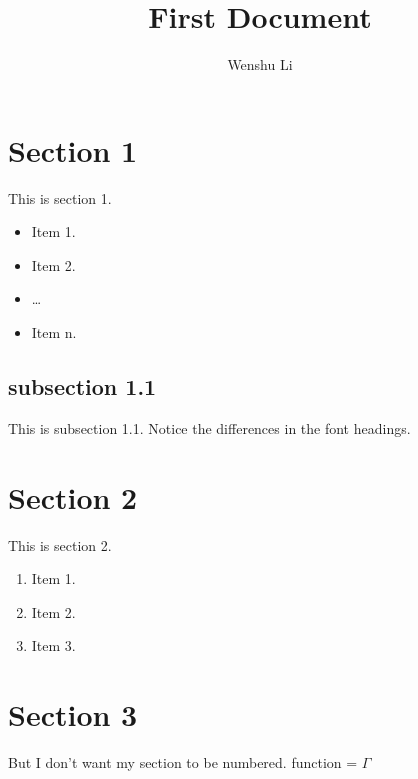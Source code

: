 \documentclass{report}
\begin{document}
\title{First Document}
\author{Wenshu Li}
\maketitle

\tableofcontents
\newpage
\section{Section 1}
This is section 1.  
\begin{itemize}
\item Item 1.
\item Item 2.
\item \ldots
\item Item n.
\end{itemize}
\subsection{subsection 1.1}
This is subsection 1.1. Notice the differences in the font headings. 
\section{Section 2}
This is section 2. 
\begin{enumerate}
\item Item 1.
\item Item 2.
\item Item 3.
\end{enumerate}


\section{Section 3}
But I don't want my section to be numbered. 
function = $\Gamma$
\end{document}

